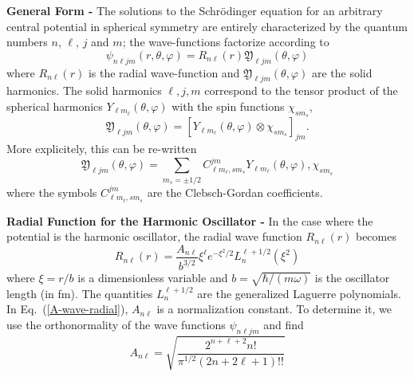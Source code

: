 \documentclass[letterpaper,12pt]{article}
\begin{document}
{\bf General Form - } The solutions to the Schr\"{o}dinger equation for an 
arbitrary central potential in spherical symmetry are entirely characterized by 
the quantum numbers $n$, $\ell$, $j$ and $m$; the wave-functions factorize 
according to
\begin{equation}
\boxed{
\psi_{n\ell jm}(r,\theta, \varphi) 
= 
R_{n\ell}(r)\mathfrak{Y}_{\ell jm}(\theta, \varphi)
      }
\label{A-wave-wf}
\end{equation}
where $R_{n\ell}(r)$ is the radial wave-function and $\mathfrak{Y}_{\ell
jm}(\theta, \varphi)$ are the solid harmonics. The solid harmonics $\ell, j,m$
correspond to the tensor product of the spherical harmonics $Y_{\ell
m_{\ell}}(\theta, \varphi)$ with the spin functions $\chi_{s m_{s}}$,
\begin{equation}
\mathfrak{Y}_{\ell jm}(\theta, \varphi) 
= 
\left[Y_{\ell m_{\ell}} (\theta, \varphi) \otimes \chi_{s m_{s}} \right]_{jm}.
\end{equation}
More explicitely, this can be re-written
\begin{equation}
\mathfrak{Y}_{\ell jm}(\theta, \varphi) 
= 
\sum_{m_{s}=\pm 1/2} 
C_{\ell m_{\ell},s m_{s}}^{jm} Y_{\ell m_{\ell}}(\theta, \varphi),
\chi_{s m_{s}}
\end{equation}
where the symbols $C_{\ell m_{\ell},s m_{s}}^{jm}$ are the Clebsch-Gordan
coefficients.

{\bf Radial Function for the Harmonic Oscillator - } In the case where the 
potential is the harmonic oscillator, the radial wave function $R_{n\ell}(r)$ 
becomes
\begin{equation}
\boxed{
R_{n\ell}(r) = \frac{A_{n\ell}}{b^{3/2}} \xi^{\ell}e^{-\xi^{2}/2} L_{n}^{\ell+1/2}(\xi^{2})
      }
\label{A-wave-radial}
\end{equation}
where $\xi = r/b$ is a dimensionless variable and $b = \sqrt{\hbar/(m\omega)}$ 
is the oscillator length (in fm). The quantities $L_{n}^{\ell+1/2}$ are the generalized 
Laguerre polynomials. In Eq.~(\ref{A-wave-radial}), $A_{n\ell}$ is a 
normalization constant. To determine it, we use the orthonormality of the 
wave functions $\psi_{n\ell j m}$ and find
\begin{equation}
\boxed{
A_{n\ell} = \sqrt{\frac{2^{n+\ell+2}n!}{\pi^{1/2}(2n + 2\ell + 1)!!} }
      }
\end{equation}

\end{document}
